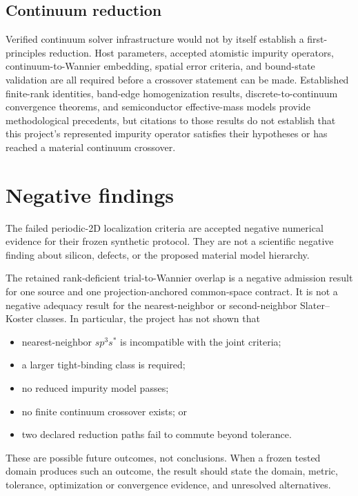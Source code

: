 \subsection{Continuum reduction}

Verified continuum solver infrastructure would not by itself establish a
first-principles reduction. Host parameters, accepted atomistic impurity
operators, continuum-to-Wannier embedding, spatial error criteria, and
bound-state validation are all required before a crossover statement can be
made. Established finite-rank identities, band-edge homogenization results,
discrete-to-continuum convergence theorems, and semiconductor effective-mass
models provide methodological precedents, but citations to those results do not
establish that this project's represented impurity operator satisfies their
hypotheses or has reached a material continuum crossover.

\section{Negative findings}


The failed periodic-2D localization criteria are accepted negative numerical
evidence for their frozen synthetic protocol. They are not a scientific
negative finding about silicon, defects, or the proposed material model
hierarchy.

The retained rank-deficient trial-to-Wannier overlap is a negative admission
result for one source and one projection-anchored common-space
contract. It is not a negative adequacy result for the nearest-neighbor or
second-neighbor Slater--Koster classes. In particular, the project has not shown
that

\begin{itemize}
  \item nearest-neighbor $sp^3s^{\ast}$ is incompatible with the joint criteria;
  \item a larger tight-binding class is required;
  \item no reduced impurity model passes;
  \item no finite continuum crossover exists; or
  \item two declared reduction paths fail to commute beyond tolerance.
\end{itemize}

These are possible future outcomes, not conclusions. When a frozen tested domain
produces such an outcome, the result should state the domain, metric, tolerance,
optimization or convergence evidence, and unresolved alternatives.

